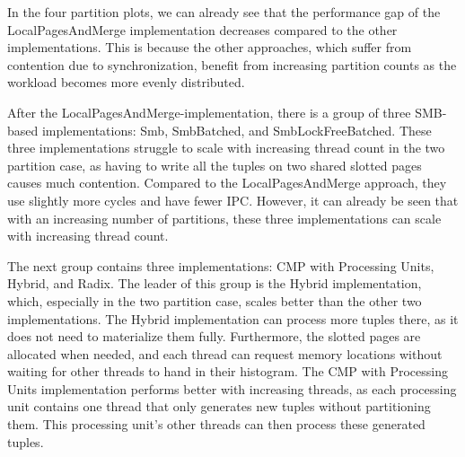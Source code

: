 In the four partition plots, we can already see that the performance gap of the LocalPagesAndMerge implementation decreases compared to the other implementations.
This is because the other approaches, which suffer from contention due to synchronization, benefit from increasing partition counts as the workload becomes more evenly distributed.

After the LocalPagesAndMerge-implementation, there is a group of three \acf{SMB}-based implementations: Smb, SmbBatched, and SmbLockFreeBatched.
These three implementations struggle to scale with increasing thread count in the two partition case, as having to write all the tuples on two shared slotted pages causes much contention.
Compared to the LocalPagesAndMerge approach, they use slightly more cycles and have fewer \ac{IPC}.
However, it can already be seen that with an increasing number of partitions, these three implementations can scale with increasing thread count.

The next group contains three implementations: \acf{CMP} with Processing Units, Hybrid, and Radix.
The leader of this group is the Hybrid implementation, which, especially in the two partition case, scales better than the other two implementations.
The Hybrid implementation can process more tuples there, as it does not need to materialize them fully.
Furthermore, the slotted pages are allocated when needed, and each thread can request memory locations without waiting for other threads to hand in their histogram.
The \ac{CMP} with Processing Units implementation performs better with increasing threads, as each processing unit contains one thread that only generates new tuples without partitioning them.
This processing unit's other threads can then process these generated tuples.

